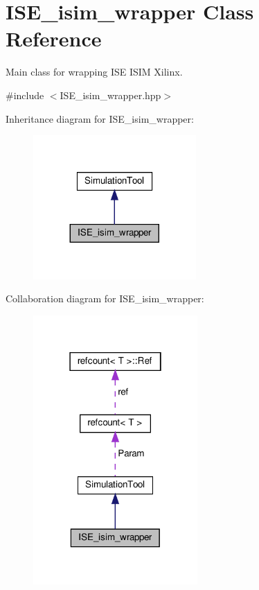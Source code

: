\hypertarget{classISE__isim__wrapper}{}\section{I\+S\+E\+\_\+isim\+\_\+wrapper Class Reference}
\label{classISE__isim__wrapper}


Main class for wrapping I\+SE I\+S\+IM Xilinx.  




{\ttfamily \#include $<$I\+S\+E\+\_\+isim\+\_\+wrapper.\+hpp$>$}



Inheritance diagram for I\+S\+E\+\_\+isim\+\_\+wrapper\+:
\nopagebreak
\begin{figure}[H]
\begin{center}
\leavevmode
\includegraphics[width=176pt]{da/dcb/classISE__isim__wrapper__inherit__graph}
\end{center}
\end{figure}


Collaboration diagram for I\+S\+E\+\_\+isim\+\_\+wrapper\+:
\nopagebreak
\begin{figure}[H]
\begin{center}
\leavevmode
\includegraphics[width=178pt]{d1/d3a/classISE__isim__wrapper__coll__graph}
\end{center}
\end{figure}

